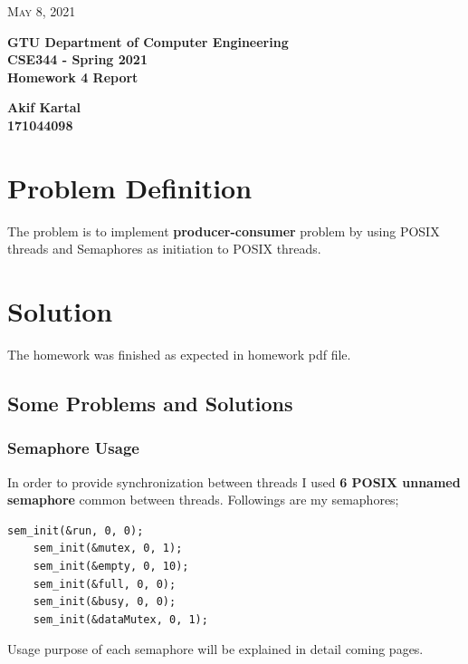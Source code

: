 \documentclass{article}
\begin{document}
\begin{titlepage}

	\begin{flushright}
	\textsc{\large May 8, 2021} \\
	\end{flushright}
	\begin{center}
	\Large{\bfseries GTU Department of Computer Engineering \\ CSE344 - Spring 2021 \\ Homework 4 Report  } \\
	\end{center}
	\vspace*{\fill}
	\begin{center}
	\Large{\bfseries Akif Kartal \\ 171044098 }
	\end{center}
	\vspace*{\fill}

\end{titlepage}

\cleardoublepage
\section{Problem Definition}
The problem is to implement \textbf{producer-consumer} problem by using POSIX threads and Semaphores as initiation to POSIX threads. 

\section{Solution}
The homework was finished as expected in homework pdf file. 
\subsection{Some Problems and Solutions}
\subsubsection{Semaphore Usage}
In order to provide synchronization between threads I used \textbf{6 POSIX unnamed semaphore} common between threads.
Followings are my semaphores;
\begin{lstlisting}[style=CStyle]
    sem_init(&run, 0, 0);
    sem_init(&mutex, 0, 1);
    sem_init(&empty, 0, 10);
    sem_init(&full, 0, 0);
    sem_init(&busy, 0, 0);
    sem_init(&dataMutex, 0, 1);
\end{lstlisting}
Usage purpose of each semaphore will be explained in detail coming pages.
\end{document}
